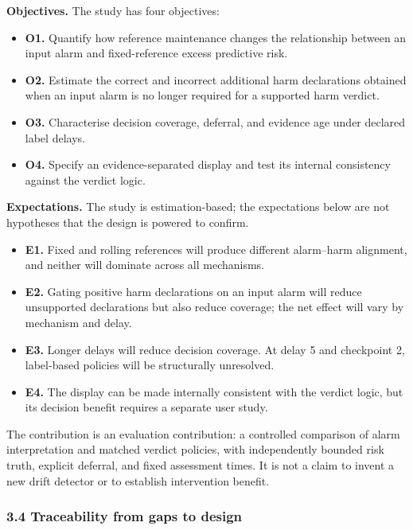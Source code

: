 \documentclass[
]{article}
\providecommand{\tightlist}{%
  \setlength{\itemsep}{0pt}\setlength{\parskip}{0pt}}
\begin{document}
\textbf{Objectives.} The study has four objectives:

\begin{itemize}
\tightlist
\item
  \textbf{O1.} Quantify how reference maintenance changes the
  relationship between an input alarm and fixed-reference excess
  predictive risk.
\item
  \textbf{O2.} Estimate the correct and incorrect additional harm
  declarations obtained when an input alarm is no longer required for a
  supported harm verdict.
\item
  \textbf{O3.} Characterise decision coverage, deferral, and evidence
  age under declared label delays.
\item
  \textbf{O4.} Specify an evidence-separated display and test its
  internal consistency against the verdict logic.
\end{itemize}

\textbf{Expectations.} The study is estimation-based; the expectations
below are not hypotheses that the design is powered to confirm.

\begin{itemize}
\tightlist
\item
  \textbf{E1.} Fixed and rolling references will produce different
  alarm--harm alignment, and neither will dominate across all
  mechanisms.
\item
  \textbf{E2.} Gating positive harm declarations on an input alarm will
  reduce unsupported declarations but also reduce coverage; the net
  effect will vary by mechanism and delay.
\item
  \textbf{E3.} Longer delays will reduce decision coverage. At delay 5
  and checkpoint 2, label-based policies will be structurally
  unresolved.
\item
  \textbf{E4.} The display can be made internally consistent with the
  verdict logic, but its decision benefit requires a separate user
  study.
\end{itemize}

The contribution is an evaluation contribution: a controlled comparison
of alarm interpretation and matched verdict policies, with independently
bounded risk truth, explicit deferral, and fixed assessment times. It is
not a claim to invent a new drift detector or to establish intervention
benefit.

\hypertarget{traceability-from-gaps-to-design}{%
\subsubsection{3.4 Traceability from gaps to
design}\label{traceability-from-gaps-to-design}}
\end{document}
